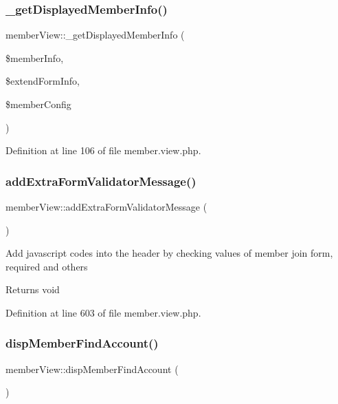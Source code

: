 \subsubsection{\texorpdfstring{\+\_\+get\+Displayed\+Member\+Info()}{\_getDisplayedMemberInfo()}}
{\footnotesize\ttfamily member\+View\+::\+\_\+get\+Displayed\+Member\+Info (\begin{DoxyParamCaption}\item[{}]{\$member\+Info,  }\item[{}]{\$extend\+Form\+Info,  }\item[{}]{\$member\+Config }\end{DoxyParamCaption})}



Definition at line 106 of file member.\+view.\+php.

\mbox{\label{classmemberView_a7500578f8585e5875626ea613763d22b}} 
\subsubsection{\texorpdfstring{add\+Extra\+Form\+Validator\+Message()}{addExtraFormValidatorMessage()}}
{\footnotesize\ttfamily member\+View\+::add\+Extra\+Form\+Validator\+Message (\begin{DoxyParamCaption}{ }\end{DoxyParamCaption})}

Add javascript codes into the header by checking values of member join form, required and others \begin{DoxyReturn}{Returns}
void 
\end{DoxyReturn}


Definition at line 603 of file member.\+view.\+php.

\mbox{\label{classmemberView_aa211f5cf6e3a62c3a24c22d75954f9c9}} 
\subsubsection{\texorpdfstring{disp\+Member\+Find\+Account()}{dispMemberFindAccount()}}
{\footnotesize\ttfamily member\+View\+::disp\+Member\+Find\+Account (\begin{DoxyParamCaption}{ }\end{DoxyParamCaption})}



